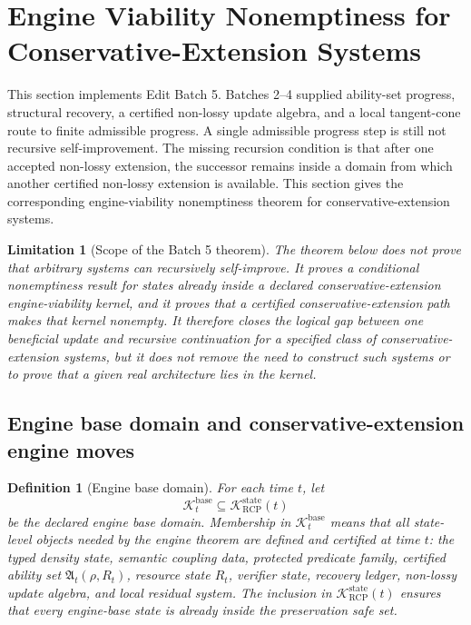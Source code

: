 \documentclass[11pt]{article}
\newtheorem{definition}[theorem]{Definition}
\newtheorem{limitation}[theorem]{Limitation}
\newcommand{\K}{\mathcal{K}}
\newcommand{\1}{\mathbf{1}}
\newcommand{\RCP}{\mathrm{RCP}}
\newcommand{\state}{\mathrm{state}}
\providecommand{\Kcal}{\mathcal{K}}
\begin{document}
\section{Engine Viability Nonemptiness for Conservative-Extension Systems}
\label{sec:engine_viability_nonemptiness}

This section implements Edit Batch 5.  Batches 2--4 supplied ability-set progress, structural recovery, a certified non-lossy update algebra, and a local tangent-cone route to finite admissible progress.  A single admissible progress step is still not recursive self-improvement.  The missing recursion condition is that after one accepted non-lossy extension, the successor remains inside a domain from which another certified non-lossy extension is available.  This section gives the corresponding engine-viability nonemptiness theorem for conservative-extension systems.

\begin{limitation}[Scope of the Batch 5 theorem]
The theorem below does not prove that arbitrary systems can recursively self-improve.  It proves a conditional nonemptiness result for states already inside a declared conservative-extension engine-viability kernel, and it proves that a certified conservative-extension path makes that kernel nonempty.  It therefore closes the logical gap between one beneficial update and recursive continuation for a specified class of conservative-extension systems, but it does not remove the need to construct such systems or to prove that a given real architecture lies in the kernel.
\end{limitation}

\subsection{Engine base domain and conservative-extension engine moves}

\begin{definition}[Engine base domain]
\label{def:engine_base_domain}
For each time \(t\), let
\[
\Kcal_t^{\mathrm{base}}
\subseteq
\K_{\RCP}^{\state}(t)
\]
be the declared engine base domain.  Membership in \(\Kcal_t^{\mathrm{base}}\) means that all state-level objects needed by the engine theorem are defined and certified at time \(t\): the typed density state, semantic coupling data, protected predicate family, certified ability set \(\mathfrak A_t(\rho,R_t)\), resource state \(R_t\), verifier state, recovery ledger, non-lossy update algebra, and local residual system.  The inclusion in \(\K_{\RCP}^{\state}(t)\) ensures that every engine-base state is already inside the preservation safe set.
\end{definition}
\end{document}
